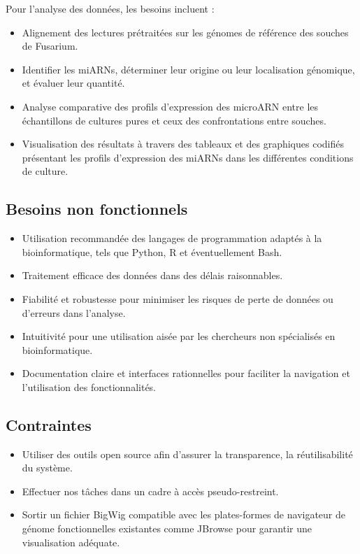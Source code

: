 Pour l'analyse des données, les besoins incluent :  
\begin{itemize}
 \item Alignement des lectures prétraitées sur les génomes de référence des souches de Fusarium.
    \item Identifier les miARNs, déterminer leur origine ou leur localisation génomique, et évaluer leur quantité.
    \item Analyse comparative des profils d'expression des microARN entre les échantillons de cultures pures et ceux des confrontations entre souches.
    \item Visualisation des résultats à travers des tableaux et des graphiques codifiés présentant les profils d'expression des miARNs dans les différentes conditions de culture.
\end{itemize}

\subsection{Besoins non fonctionnels}
\begin{itemize}
    \item Utilisation recommandée des langages de programmation adaptés à la bioinformatique, tels que Python, R et éventuellement Bash.
    \item Traitement efficace des données dans des délais raisonnables.
    \item Fiabilité et robustesse pour minimiser les risques de perte de données ou d'erreurs dans l'analyse.
    \item Intuitivité pour une utilisation aisée par les chercheurs non spécialisés en bioinformatique.
    \item Documentation claire et interfaces rationnelles pour faciliter la navigation et l'utilisation des fonctionnalités.
\end{itemize}

\subsection{Contraintes}
\begin{itemize}
    \item Utiliser des outils open source afin d'assurer la transparence, la réutilisabilité du système.
    \item Effectuer nos tâches dans un cadre à accès pseudo-restreint.
    \item Sortir un fichier BigWig compatible avec les plates-formes de navigateur de génome fonctionnelles existantes comme JBrowse pour garantir une visualisation adéquate.
\end{itemize}

